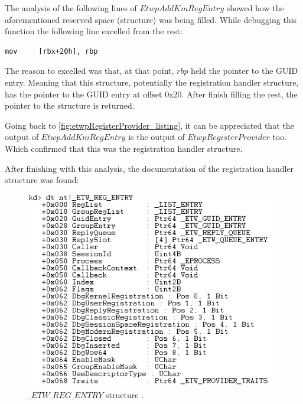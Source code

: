 The analysis of the following lines of $EtwpAddKmRegEntry$ showed how the aforementioned reserved space (structure) was being filled. While debugging this function the following line excelled from the rest:
\begin{lstlisting}
mov     [rbx+20h], rbp
\end{lstlisting}

The reason to excelled was that, at that point, $rbp$ held the pointer to the GUID entry. Meaning that this structure, potentially the registration handler structure, has the pointer to the GUID entry at offset 0x20. After finish filling the rest, the pointer to the structure is returned.

Going back to \ref{fig:etwpRegisterProvider_listing}, it can be appreciated that the output of $EtwpAddKmRegEntry$ is the output of $EtwpRegisterProvider$ too. Which confirmed that this was the registration handler structure.

After finishing with this analysis, the documentation of the registration handler structure was found:

\begin{centering}
  \begin{figure}[H]
    \includegraphics[width=12cm]{images/etw_reg_entry.png}
    \caption[]{$\_ETW\_REG\_ENTRY$ structure .}
    \label{fig:regentrylayout}
  \end{figure}
\end{centering}





